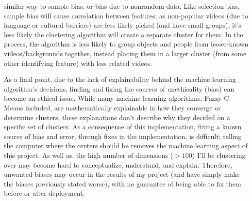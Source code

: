 \documentclass[10pt,twocolumn]{article}
\begin{document}
similar way to sample bias, or bias due to nonrandom data. Like selection bias, sample bias will cause correlation between features; as non-popular videos (due to language or cultural barriers) are less likely picked (and have small groups), it’s less likely the clustering algorithm will create a separate cluster for them. In the process, the algorithm is less likely to group objects and people from lesser-known videos/backgrounds together, instead placing them in a larger cluster (from some other identifying feature) with less related videos.

As a final point, due to the lack of explainability behind the machine learning algorithm’s decisions, finding and fixing the sources of unethicality (bias) can become an ethical issue. While many machine learning algorithms, Fuzzy C-Means included, are mathematically explainable in how they converge or determine clusters, these explanations don’t describe why they decided on a specific set of clusters. As a consequence of this implementation, fixing a known source of bias and error, through fixes in the implementation, is difficult; telling the computer where the centers should be removes the machine learning aspect of this project. As well as, the high number of dimensions (\(>100\)) I'll be clustering over may become hard to conceptualize, understand, and explain. Therefore, unwanted biases may occur in the results of my project (and have simply make the biases previously stated worse), with no guarantee of being able to fix them before or after deployment. 
\end{document}
